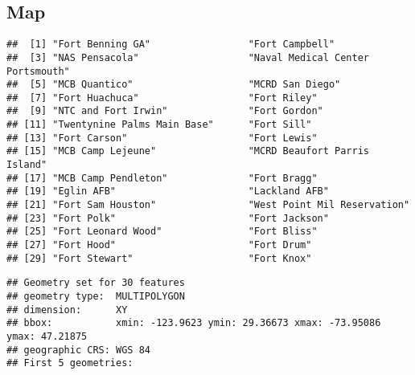 \documentclass[
]{article}
\newenvironment{Shaded}{\begin{snugshade}}{\end{snugshade}}
\newcommand{\FunctionTok}[1]{\textcolor[rgb]{0.00,0.00,0.00}{#1}}
\newcommand{\NormalTok}[1]{#1}
\newcommand{\OtherTok}[1]{\textcolor[rgb]{0.56,0.35,0.01}{#1}}
\newcommand{\SpecialCharTok}[1]{\textcolor[rgb]{0.00,0.00,0.00}{#1}}
\newcommand{\StringTok}[1]{\textcolor[rgb]{0.31,0.60,0.02}{#1}}
\begin{document}
\hypertarget{map}{%
\subsection{Map}\label{map}}

\begin{Shaded}
\end{Shaded}

\begin{verbatim}
##  [1] "Fort Benning GA"                 "Fort Campbell"                  
##  [3] "NAS Pensacola"                   "Naval Medical Center Portsmouth"
##  [5] "MCB Quantico"                    "MCRD San Diego"                 
##  [7] "Fort Huachuca"                   "Fort Riley"                     
##  [9] "NTC and Fort Irwin"              "Fort Gordon"                    
## [11] "Twentynine Palms Main Base"      "Fort Sill"                      
## [13] "Fort Carson"                     "Fort Lewis"                     
## [15] "MCB Camp Lejeune"                "MCRD Beaufort Parris Island"    
## [17] "MCB Camp Pendleton"              "Fort Bragg"                     
## [19] "Eglin AFB"                       "Lackland AFB"                   
## [21] "Fort Sam Houston"                "West Point Mil Reservation"     
## [23] "Fort Polk"                       "Fort Jackson"                   
## [25] "Fort Leonard Wood"               "Fort Bliss"                     
## [27] "Fort Hood"                       "Fort Drum"                      
## [29] "Fort Stewart"                    "Fort Knox"
\end{verbatim}

\begin{Shaded}
\end{Shaded}

\begin{verbatim}
## Geometry set for 30 features 
## geometry type:  MULTIPOLYGON
## dimension:      XY
## bbox:           xmin: -123.9623 ymin: 29.36673 xmax: -73.95086 ymax: 47.21875
## geographic CRS: WGS 84
## First 5 geometries:
\end{verbatim}
\end{document}
